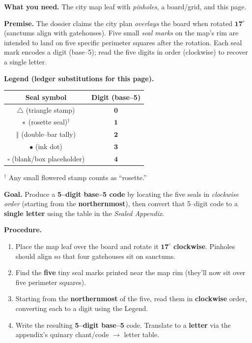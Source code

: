\documentclass[11pt]{article}
\numberwithin{equation}{section} %
\theoremstyle{plain} %
\theoremstyle{definition} %
\theoremstyle{remark} %
\begin{document}
\noindent\textbf{What you need.} The city map leaf with \emph{pinholes}, a board/grid, and this page.

\medskip
\noindent\textbf{Premise.} The dossier claims the city plan \emph{overlays} the board when rotated \(\mathbf{17^\circ}\) (sanctums align with gatehouses). Five small \emph{seal marks} on the map’s rim are intended to land on five specific perimeter squares after the rotation. Each seal mark encodes a digit (base–5); read the five digits in order (clockwise) to recover a single letter.

\medskip
\noindent\textbf{Legend (ledger substitutions for this page).}
\begin{center}
\begin{tabular}{c|c}
\textbf{Seal symbol} & \textbf{Digit (base–5)} \\
\hline
\(\triangle\) (triangle stamp) & \(\mathbf{0}\) \\
\(\large\ast\) (rosette seal)\(^\dagger\) & \(\mathbf{1}\) \\
\(\Vert\) (double–bar tally) & \(\mathbf{2}\) \\
\(\bullet\) (ink dot) & \(\mathbf{3}\) \\
\(\square\) (blank/box placeholder) & \(\mathbf{4}\) \\
\end{tabular}
\end{center}
\noindent\(^\dagger\) Any small flowered stamp counts as “rosette.”

\medskip
\noindent\textbf{Goal.} Produce a \textbf{5–digit base–5 code} by locating the five seals in \emph{clockwise order} (starting from the \textbf{northernmost}), then convert that 5–digit code to a \textbf{single letter} using the table in the \emph{Sealed Appendix}.

\medskip
\noindent\textbf{Procedure.}
\begin{enumerate}\setlength\itemsep{0.2em}
  \item Place the map leaf over the board and rotate it \(\mathbf{17^\circ}\) \textbf{clockwise}. Pinholes should align so that four gatehouses sit on sanctums.
  \item Find the \textbf{five} tiny seal marks printed near the map rim (they’ll now sit over five perimeter squares).
  \item Starting from the \textbf{northernmost} of the five, read them in \textbf{clockwise} order, converting each to a digit using the Legend.
  \item Write the resulting \textbf{5–digit base–5} code. Translate to a \textbf{letter} via the appendix’s quinary chant/code \(\rightarrow\) letter table.
\end{enumerate}
\end{document}
